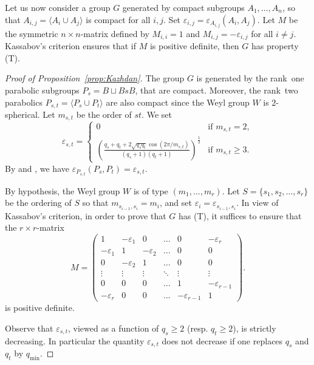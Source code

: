 \documentclass[12pt,a4paper]{amsproc}
\theoremstyle{definition}
\newcommand{\qmin}{q_{\mathrm{min}}}
\begin{document}
Let us now consider a group $G$ generated by compact subgroups $A_1, \dots, A_n$, so that $A_{i, j} = \langle A_i \cup A_j \rangle$ is compact for all $i, j$. Set $\varepsilon_{i, j} = \varepsilon_{A_{i, j}}(A_i, A_j)$. Let $M$ be the symmetric $n\times n$-matrix defined by $M_{i, i} = 1$ and $M_{i, j}= -\varepsilon_{i, j}$  for all $i \neq j$. Kassabov's criterion \cite[\S2]{Ka11} ensures that if $M$ is positive definite, then $G$ has property (T). 
	

\begin{proof}[Proof of Proposition~\ref{prop:Kazhdan}]
The group $G$ is generated by the rank~one parabolic subgroups $P_s = B \sqcup BsB$, that are compact. Moreover, the rank~two parabolics $P_{s, t} = \langle P_s \cup P_t\rangle$ are also compact since the Weyl group $W$ is $2$-spherical. Let $m_{s, t}$ be the order of $st$. We set
$$\varepsilon_{s, t} = \left\{
\begin{array}{ll}
0 & \text{if } m_{s, t} = 2,\\
\displaystyle \left( \frac{q_s + q_t + 2\sqrt{q_s q_t}\cos(2\pi/m_{s, t})}{(q_s+1)(q_t+1)}\right)^{\frac 1 2}
&\text{if } m_{s, t} \geq 3.
\end{array}
\right.
$$
By \cite[Proposition~7.1]{Garland} and \cite[Theorem~2.10(ii)]{CKKW}, we have $\varepsilon_{P_{s, t}}(P_s, P_t) = \varepsilon_{s, t}$. 

By hypothesis, the Weyl group $W$ is of type $(m_1, \dots, m_r)$. Let $S = \{s_1, s_2, \dots, s_{r}\}$ be the ordering of $S$ so that $m_{s_{i-1}, s_i} = m_i$, and set $\varepsilon_i = \varepsilon_{s_{i-1}, s_i}$. In view of Kassabov's criterion, in order to prove that $G$ has (T), it suffices to ensure that the $r\times r$-matrix 
$$M =  \left(
\begin{array}{cccccc}
1 & -\varepsilon_1 & 0 & \dots & 0 & -\varepsilon_r \\ 
-\varepsilon_1 & 1 & -\varepsilon_2 & \dots & 0 & 0 \\
0 & -\varepsilon_2 & 1 & \dots & 0 & 0 \\
\vdots & \vdots & \vdots &  \ddots & \vdots & \vdots  \\ 
0 & 0 & 0 & \dots &  1 & -\varepsilon_{r-1} \\
-\varepsilon_r & 0 & 0 & \dots & -\varepsilon_{r-1} & 1 
\end{array}
\right).
$$
is positive definite. 

Observe that $\varepsilon_{s, t}$, viewed as a function of $q_s \geq 2$ (resp. $q_t \geq 2$),  is  strictly decreasing. In particular the quantity $\varepsilon_{s, t}$ does not decrease if one replaces $q_s$ and $q_t$ by $\qmin$. 


\end{proof}
\end{document}
